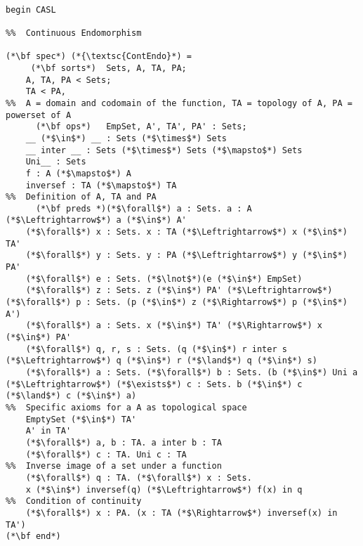 \usepackage{enumerate}
\usepackage{amsmath}
\usepackage{lmodern}
\usepackage{listings}




\begin{lstlisting}

begin CASL

%%  Continuous Endomorphism

(*\bf spec*) (*{\textsc{ContEndo}*) =	    
     (*\bf sorts*)	Sets, A, TA, PA;
    A, TA, PA < Sets;
    TA < PA,
%%  A = domain and codomain of the function, TA = topology of A, PA = powerset of A
      (*\bf ops*)   EmpSet, A', TA', PA' : Sets;
    __ (*$\in$*) __ : Sets (*$\times$*) Sets
    __ inter __ : Sets (*$\times$*) Sets (*$\mapsto$*) Sets
    Uni__ : Sets
    f : A (*$\mapsto$*) A
    inversef : TA (*$\mapsto$*) TA 
%%  Definition of A, TA and PA
      (*\bf preds *)(*$\forall$*) a : Sets. a : A (*$\Leftrightarrow$*) a (*$\in$*) A'
    (*$\forall$*) x : Sets. x : TA (*$\Leftrightarrow$*) x (*$\in$*) TA'
    (*$\forall$*) y : Sets. y : PA (*$\Leftrightarrow$*) y (*$\in$*) PA'  
    (*$\forall$*) e : Sets. (*$\lnot$*)(e (*$\in$*) EmpSet)
    (*$\forall$*) z : Sets. z (*$\in$*) PA' (*$\Leftrightarrow$*) (*$\forall$*) p : Sets. (p (*$\in$*) z (*$\Rightarrow$*) p (*$\in$*) A')
    (*$\forall$*) a : Sets. x (*$\in$*) TA' (*$\Rightarrow$*) x (*$\in$*) PA'  
    (*$\forall$*) q, r, s : Sets. (q (*$\in$*) r inter s (*$\Leftrightarrow$*) q (*$\in$*) r (*$\land$*) q (*$\in$*) s)
    (*$\forall$*) a : Sets. (*$\forall$*) b : Sets. (b (*$\in$*) Uni a (*$\Leftrightarrow$*) (*$\exists$*) c : Sets. b (*$\in$*) c (*$\land$*) c (*$\in$*) a)
%%  Specific axioms for a A as topological space
    EmptySet (*$\in$*) TA'
    A' in TA'
    (*$\forall$*) a, b : TA. a inter b : TA 
    (*$\forall$*) c : TA. Uni c : TA
%%  Inverse image of a set under a function
    (*$\forall$*) q : TA. (*$\forall$*) x : Sets. 
    x (*$\in$*) inversef(q) (*$\Leftrightarrow$*) f(x) in q
%%  Condition of continuity
    (*$\forall$*) x : PA. (x : TA (*$\Rightarrow$*) inversef(x) in TA')
(*\bf end*)
\end{lstlisting}

